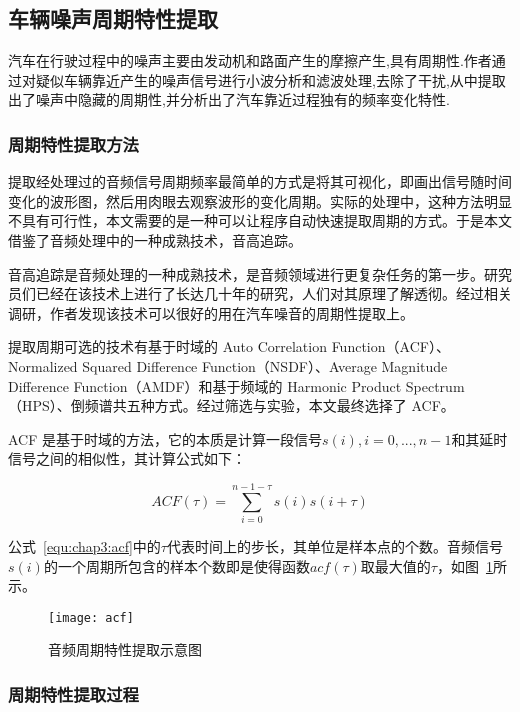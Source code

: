 \subsection{车辆噪声周期特性提取}

汽车在行驶过程中的噪声主要由发动机和路面产生的摩擦产生,具有周期性.作者通过对疑似车辆靠近产生的噪声信号进行小波分析和滤波处理,去除了干扰,从中提取出了噪声中隐藏的周期性,并分析出了汽车靠近过程独有的频率变化特性.

\subsubsection{周期特性提取方法}

提取经处理过的音频信号周期频率最简单的方式是将其可视化，即画出信号随时间变化的波形图，然后用肉眼去观察波形的变化周期。实际的处理中，这种方法明显不具有可行性，本文需要的是一种可以让程序自动快速提取周期的方式。于是本文借鉴了音频处理中的一种成熟技术，音高追踪。

音高追踪是音频处理的一种成熟技术，是音频领域进行更复杂任务的第一步。研究员们已经在该技术上进行了长达几十年的研究，人们对其原理了解透彻。经过相关调研，作者发现该技术可以很好的用在汽车噪音的周期性提取上。

提取周期可选的技术有基于时域的 Auto Correlation Function（ACF）、Normalized Squared Difference Function（NSDF）、Average Magnitude Difference Function（AMDF）和基于频域的 Harmonic Product Spectrum（HPS）、倒频谱共五种方式。经过筛选与实验，本文最终选择了 ACF。

ACF 是基于时域的方法，它的本质是计算一段信号$s(i),i=0,...,n-1$和其延时信号之间的相似性，其计算公式如下：

\begin{equation}
\label{equ:chap3:acf}
ACF\left( \tau  \right) = \sum\limits_{i = 0}^{n - 1 - \tau } {s\left( i \right)s\left( {i + \tau } \right)} 
\end{equation}


公式~\ref{equ:chap3:acf}中的$\tau$代表时间上的步长，其单位是样本点的个数。音频信号$s(i)$的一个周期所包含的样本个数即是使得函数$acf(\tau)$取最大值的$\tau$，如图~\ref{fig:acf}所示。


\begin{figure}[htbp] %
  \centering
  \texttt{[image: acf]}
  \caption{音频周期特性提取示意图}
  \label{fig:acf}
\end{figure}



\subsubsection{周期特性提取过程}

